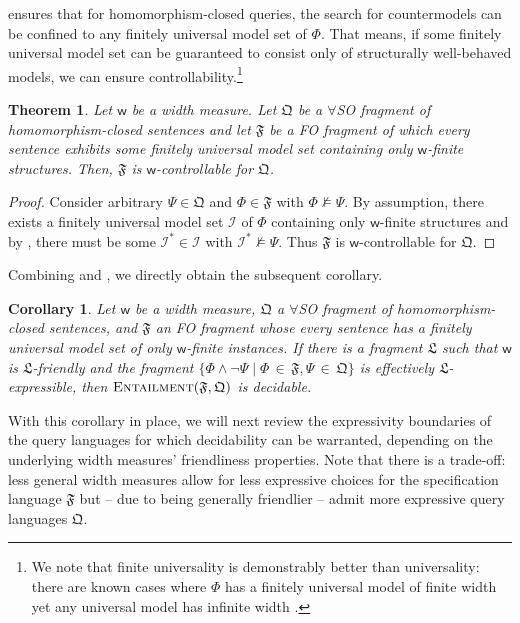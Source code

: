 \documentclass[10pt,a4paper]{amsart}
\theoremstyle{definition}
\numberwithin{equation}{section}
\theoremstyle{plain}
\newtheorem{theorem}[theorem]{Theorem}
\newtheorem{corollary}[corollary]{Corollary}
\theoremstyle{definition}
\theoremstyle{myexample}
\theoremstyle{plain}
\theoremstyle{definition}
\newcommand{\instance}{\mathcal{I}}
\newcommand{\fcn}[1]{\mathsf{#1}}
\begin{document}
%
 ensures that for homomorphism-closed queries, the search for countermodels can be confined to any finitely universal model set of $\Phi$. That means, if some finitely universal model set can be guaranteed to consist only of structurally well-behaved models, we can ensure controllability.\footnote{We note that finite universality is demonstrably better than universality: there are known cases where $\Phi$ has a finitely universal model of finite width yet any universal model has infinite width \cite{BMR2023}.} 
%
\begin{theorem}\label{thm:univmodelset}
Let $\fcn{w}$ be a width measure.
Let $\mathfrak{Q}$ be a $\forall$SO fragment of homomorphism-closed sentences and let $\mathfrak{F}$ be a FO fragment of which every sentence exhibits some finitely universal model set containing only $\fcn{w}$-finite structures. 
Then, $\mathfrak{F}$ is $\fcn{w}$-controllable for $\mathfrak{Q}$.
\end{theorem}
%
\begin{proof}
Consider arbitrary $\Psi \in \mathfrak{Q}$ and  $\Phi \in \mathfrak{F}$ with $\Phi \not \models \Psi$. By assumption, there exists a finitely universal model set $\mathscr{I}$ of $\Phi$ containing only $\fcn{w}$-finite structures and by , there must be some $\instance^* \in \mathscr{I}$ with $\instance^* \not\models \Psi$. Thus $\mathfrak{F}$ is $\fcn{w}$-controllable for $\mathfrak{Q}$.
\end{proof}
%
Combining  and , we directly obtain the subsequent corollary.
%
\begin{corollary}\label{cor:dechomquerying}
	Let $\fcn{w}$ be a width measure,
	$\mathfrak{Q}$ a $\forall$SO fragment of homomorphism-closed sen\-ten\-ces, and
	$\mathfrak{F}$ an FO fragment whose every sentence has a finitely universal model set of only $\fcn{w}$-finite instances.
	If there is a fragment $\mathfrak{L}$ such that $\fcn{w}$ is $\mathfrak{L}$-friendly
	and the fragment $\{\Phi \wedge \neg \Psi \mid \Phi {\,\in\,} \mathfrak{F}, \Psi {\,\in\,} \mathfrak{Q}\}$ is effectively 
	$\mathfrak{L}$-expressible, then $\textsc{Entailment}(\mathfrak{F},\mathfrak{Q})$ is decidable.
\end{corollary}
%
With this corollary in place, we will next review the expressivity boundaries of the query languages for which decidability can be warranted, depending on the underlying width measures' friendliness properties. 
Note that there is a trade-off: less general width measures allow for less expressive choices for the specification language $\mathfrak{F}$ but -- due to being generally friendlier -- admit more expressive query languages $\mathfrak{Q}$.
\end{document}
